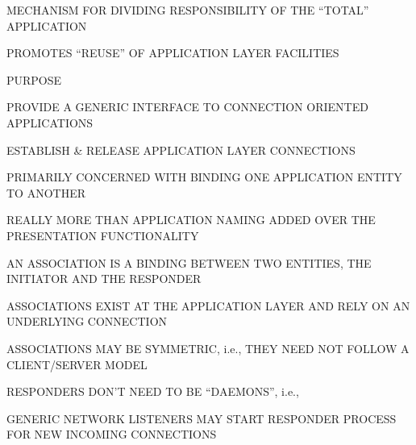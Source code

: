 \begin{bwslide}

\begin{nrtc}
\item	MECHANISM FOR DIVIDING RESPONSIBILITY OF THE ``TOTAL'' APPLICATION
\item	PROMOTES ``REUSE'' OF APPLICATION LAYER FACILITIES
\end{nrtc}
\end{bwslide}




\begin{bwslide}

\begin{nrtc}
\item	PURPOSE
	\begin{nrtc}
	\item	PROVIDE A GENERIC INTERFACE TO CONNECTION ORIENTED APPLICATIONS
	\item	ESTABLISH \& RELEASE APPLICATION LAYER CONNECTIONS
	\item	PRIMARILY CONCERNED WITH BINDING ONE APPLICATION ENTITY TO ANOTHER
	\end{nrtc}
\item	REALLY MORE THAN APPLICATION NAMING ADDED OVER THE PRESENTATION FUNCTIONALITY
\end{nrtc}
\end{bwslide}


\begin{bwslide}

\begin{nrtc}
\item	AN ASSOCIATION IS A BINDING BETWEEN TWO ENTITIES, THE INITIATOR AND
	THE RESPONDER
\item	ASSOCIATIONS EXIST AT THE APPLICATION LAYER AND RELY ON AN 
	UNDERLYING CONNECTION
\item	ASSOCIATIONS MAY BE SYMMETRIC, i.e., THEY NEED NOT FOLLOW A CLIENT/SERVER
	MODEL
\item	RESPONDERS DON'T NEED TO BE ``DAEMONS'', i.e.,
	\begin{nrtc}
	\item	GENERIC NETWORK LISTENERS MAY START RESPONDER PROCESS FOR
		NEW INCOMING CONNECTIONS
	\end{nrtc}
\end{nrtc}
\end{bwslide}


